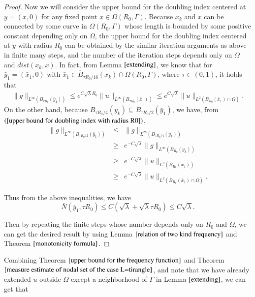 \documentclass[a4paper, 12pt, onecolumn]{article} \textwidth 148mm
\begin{document}
\begin{proof}
Now we will consider the upper bound for the doubling index centered at $y=(x,0)$ for any fixed point $x\in\Omega(R_0,\Gamma)$.
Because $x_k$ and $x$ can be connected by some curve in $\Omega(R_0,\Gamma)$ whose length is bounded by some positive constant depending only on $\Omega$, the upper bound for the doubling index centered at $y$ with radius $R_0$ can be obtained by the similar iteration  arguments as above in finite many steps, and the number of the iteration steps depends only on $\Omega$ and $dist(x_k,x)$. In fact, from Lemma $\ref{extending}$, we know that for $\bar{y}_1=(\bar{x}_1,0)$ with $\bar{x}_1\in\overline B_{\tau R_0/16}(x_k)\cap\Omega(R_0,\Gamma)$, where $\tau\in(0,1)$, it holds that
\begin{eqnarray*}
\|g\|_{L^{\infty}(B_{\tau R_0}(\bar{y}_1))}\leq e^{C\sqrt{\lambda}R_0}\|u\|_{L^{\infty}(B_{\tau R_0}(\bar{x}_1))}\leq e^{C\sqrt{\lambda}}\|u\|_{L^2(B_{R_0}(\bar{x}_1)\cap\Omega)}.
\end{eqnarray*}
On the other hand, because $B_{\tau R_0/4}(y_k)\subseteq B_{\tau R_0/2}(\bar{y}_1)$, we have, from $(\ref{upper bound for doubling index with radius R0})$,
\begin{eqnarray*}
\|g\|_{L^{\infty}(B_{\tau R_0/2}(\bar{y}_1))}&\leq&\|g\|_{L^{\infty}(B_{\tau R_0/4}(y_k))}
\\&\geq& e^{-C\sqrt{\lambda}}\|g\|_{L^{\infty}(B_{R_0}(y_k))}\\&\geq& e^{-C\sqrt{\lambda}}\|u\|_{L^2(B_{R_0}(\bar{x}_1))}
\\&\geq&e^{-C\sqrt{\lambda}}\|u\|_{L^2(B_{R_0}(\bar{x}_1)\cap\Omega)}.
\end{eqnarray*}

Thus from the above inequalities, we have
\begin{equation*}
\bar{N}(\bar{y}_1,\tau R_0)\leq C(\sqrt{\lambda}+\sqrt{\lambda}\tau R_0)\leq C\sqrt{\lambda}.
\end{equation*}

Then by repeating the finite steps whose number depends only on $R_0$ and $\Omega$, we can get the desired result by using Lemma $\ref{relation of two kind frequency}$ and Theorem $\ref{monotonicity formula}$.
\end{proof}

Combining Theorem $\ref{upper bound for the frequency function}$ and Theorem $\ref{measure estimate of nodal set of the case L=tirangle}$, and note that we have already extended $u$ outside $\Omega$ except a neighborhood of $\Gamma$ in Lemma $\ref{extending}$, we can get that
\end{document}
